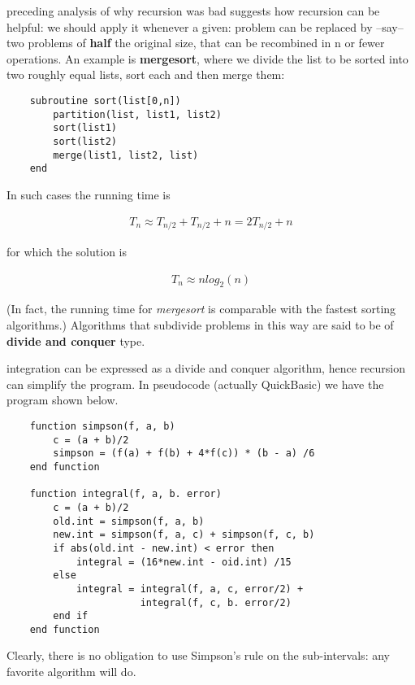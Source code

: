  preceding analysis of why recursion was bad suggests how recursion can be helpful: we should apply it whenever a given: problem can be replaced by --say-- two problems of \textbf{half} the original size, that can be recombined in n or fewer operations. An example is \textbf{mergesort}, where we divide the list to be sorted into two roughly equal lists, sort each and then merge them:

\begin{verbatim}
    subroutine sort(list[0,n])
        partition(list, list1, list2)
        sort(list1)
        sort(list2)
        merge(list1, list2, list)
    end
\end{verbatim}

In such cases the running time is

\begin{align}
T_{n} \approx T_{n/2} + T_{n/2} + n = 2T_{n/2} + n
\end{align}

for which the solution is

\begin{align}
T_{n} \approx n log_2 (n)
\end{align}

(In fact, the running time for \textit{mergesort} is comparable with the fastest sorting algorithms.) Algorithms that subdivide problems in this way are said to be of \textbf{divide and conquer} type.

 integration can be expressed as a divide and conquer algorithm, hence recursion can simplify the program. In pseudocode (actually QuickBasic\textregistered) we have the program shown
below.

\begin{verbatim}
    function simpson(f, a, b)
        c = (a + b)/2
        simpson = (f(a) + f(b) + 4*f(c)) * (b - a) /6
    end function

    function integral(f, a, b. error)
        c = (a + b)/2
        old.int = simpson(f, a, b)
        new.int = simpson(f, a, c) + simpson(f, c, b)
        if abs(old.int - new.int) < error then
            integral = (16*new.int - oid.int) /15
        else
            integral = integral(f, a, c, error/2) +
                       integral(f, c, b. error/2)
        end if
    end function
\end{verbatim}

Clearly, there is no obligation to use Simpson's rule on the sub-intervals: any favorite algorithm will do.

